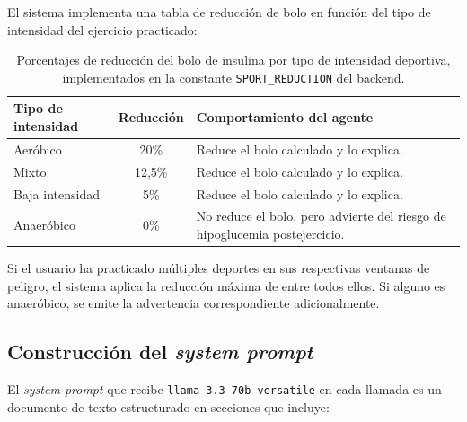 El sistema implementa una tabla de reducción de bolo en función del tipo de
intensidad del ejercicio practicado:

\begin{table}[H]
\centering
\caption{Porcentajes de reducción del bolo de insulina por tipo de intensidad
         deportiva, implementados en la constante \texttt{SPORT\_REDUCTION} del backend.}
\label{tab:sport-reduction}
\begin{tabular}{|l|c|p{6cm}|}
\hline
\textbf{Tipo de intensidad} & \textbf{Reducción} & \textbf{Comportamiento del agente} \\
\hline
Aeróbico        & 20\%  & Reduce el bolo calculado y lo explica. \\
Mixto           & 12,5\% & Reduce el bolo calculado y lo explica. \\
Baja intensidad & 5\%   & Reduce el bolo calculado y lo explica. \\
Anaeróbico      & 0\%   & No reduce el bolo, pero advierte del riesgo de hipoglucemia postejercicio. \\
\hline
\end{tabular}
\end{table}

Si el usuario ha practicado múltiples deportes en sus respectivas ventanas de peligro,
el sistema aplica la reducción máxima de entre todos ellos. Si alguno es anaeróbico,
se emite la advertencia correspondiente adicionalmente.

\subsection{Construcción del \textit{system prompt}}
\label{subsec:system-prompt}

El \textit{system prompt} que recibe \texttt{llama-3.3-70b-versatile} en cada llamada es un documento de texto
estructurado en secciones que incluye:

